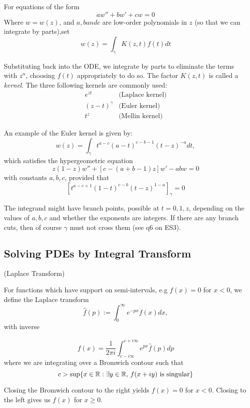 \documentclass[a4paper]{article}
\begin{document}
For equations of the form
\[
aw'' + bw' + cw =0
\]
Where $w=w(z)$, and $a,b and c$ are low-order polynomials in $z$ (so that we can integrate by parts),set
 \[
	 w(z) = \int_{\gamma} K(z,t)f(t)dt
\]

Substituting back into the ODE, we integrate by parts to eliminate the terms with $z^{n}$, choosing $f(t)$ appropriately to do so. The factor $K(z,t)$ is called a \textit{kernel}. The three following kernels are commonly used:
\begin{align*}
	e^{zt} & \text{(Laplace kernel)} \\
	(z-t)^{\gamma} & \text{(Euler kernel)}\\
	t^{z} & \text{(Mellin kernel)}
\end{align*}

An example of the Euler kernel is given by:
\[
	w(z) = \int_{\gamma} t^{a-c} (a-t)^{c-b-1} (t-z)^{-a} dt
,\] which satisfies the hypergeometric equation
\[
	z(1-z)w'' + [c - (a+b-1)z] w' -abw = 0
\] with constants $a,b,c$, provided that
\[
	\left[ t^{a-c+1} (1-t)^{c-b} (t-z)^{1-a}\right]_{\gamma} = 0  
\] 

The integrand might have branch points, possible at $t = 0, 1, z$, depending on the values of $a, b, c$ and whether the exponents are integers. If there are any branch cuts, then of course $\gamma$ must not cross them (see q6 on ES3).

\subsection{Solving PDEs by Integral Transform}

\begin{defn} (Laplace Transform)

	For functions which have support on semi-intervals, e.g  $f(x) = 0$ for $x < 0$, we define the Laplace transform
	 \[
		 \hat{f}(p) :=  \int_{0}^{\infty} e^{-px}f(x) dx
	,\]  with inverse

	\[
		f(x) =\frac{1}{2\pi i} \int_{c - i\infty}^{c + i\infty} e^{px} \hat{f}(p) dp
	\] 
	where we are integrating over a Bromwich contour such that 
	\[ c > \sup\{x \in \mathbb{R}: \exists y  \in \mathbb{R}, \, f(x + iy) \text{ is singular}\} \]

	Closing the Bromwich contour to the right yields  $f(x) = 0$ for $x < 0$. Closing to the left gives us $f(x)$ for $x \ge 0.$
\end{defn}
\end{document}
